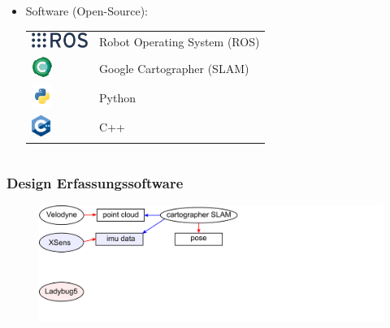 \documentclass[aspectratio=169]{beamer}
\begin{document}
\begin{frame}
\begin{columns}[onlytextwidth]
\begin{column}{0.66\textwidth}
\begin{itemize}
\begin{tabular}{ll}
	 \end{tabular}
       \item Software (Open-Source): \newline
      \begin{tabular}{ll}
	\includegraphics[height=0.5cm]{./Abbildungen/ros_logo.png} & Robot Operating System (ROS) \\
	\includegraphics[height=0.7cm]{./Abbildungen/20636162.png} & Google Cartographer (SLAM)\\
	\includegraphics[height=0.7cm]{./Abbildungen/opengraph-icon-200x200.png} & Python\\
	\includegraphics[height=0.7cm]{./Abbildungen/cpp_logo.png} & C++
       \end{tabular}
      \end{itemize}
    \end{column}
  \end{columns}
\end{frame}

\begin{frame}
\frametitle{Design Erfassungssoftware}
     \begin{figure}[h]
       \centering
       \includegraphics[width=13.5cm]{./Abbildungen/ROSImageCapturing_1.png}
     \end{figure}
\end{frame}
\end{document}
